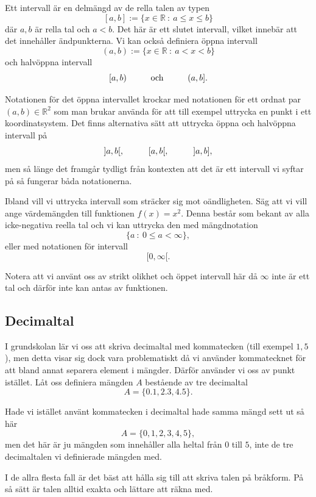 \documentclass[titlepage]{article}
\begin{document}
Ett intervall är en delmängd av de rella talen av typen
$$[a,b] := \{x \in \mathbb{R}\: : \: a\leq x \leq b\}$$
där $a,b$ är rella tal och $a<b$. Det här är ett slutet intervall, vilket innebär att det innehåller ändpunkterna. Vi kan också definiera öppna intervall 
$$(a,b) := \{x \in \mathbb{R} \: : \: a<x<b\}$$
och halvöppna intervall
$$[a,b) \hspace{10mm} \text{och} \hspace{10mm}(a,b].$$

Notationen för det öppna intervallet krockar med notationen för ett ordnat par $(a,b) \in \mathbb{R}^2$ som man brukar använda för att till exempel uttrycka en punkt i ett koordinatsystem. Det finns alternativa sätt att uttrycka öppna och halvöppna intervall på
$$]a,b[, \hspace{10mm} [a,b[, \hspace{10mm} ]a,b],$$
men så länge det framgår tydligt från kontexten att det är ett intervall vi syftar på så fungerar båda notationerna.

Ibland vill vi uttrycka intervall som sträcker sig mot oändligheten. Säg att vi vill ange värdemängden till funktionen $f(x) = x^2$. Denna består som bekant av alla icke-negativa reella tal och vi kan uttrycka den med mängdnotation
$$\{ a \: : \: 0 \leq a < \infty \},$$
eller med notationen för intervall
$$[0, \infty[.$$

Notera att vi använt oss av strikt olikhet och öppet intervall här då $\infty$ inte är ett tal och därför inte kan antas av funktionen.




\subsection{Decimaltal}

I grundskolan lär vi oss att skriva decimaltal med kommatecken (till exempel $1,5$), men detta visar sig dock vara problematiskt då vi använder kommatecknet för att bland annat separera element i mängder. Därför använder vi oss av punkt istället. Låt oss definiera mängden $A$ bestående av tre decimaltal
$$A = \{0.1,2.3,4.5\}.$$

Hade vi istället använt kommatecken i decimaltal hade samma mängd sett ut så här
$$A = \{0,1,2,3,4,5\},$$
men det här är ju mängden som innehåller alla heltal från $0$ till $5$, inte de tre decimaltalen vi definierade mängden med.

I de allra flesta fall är det bäst att hålla sig till att skriva talen på bråkform. På så sätt är talen alltid exakta och lättare att räkna med.
\end{document}
